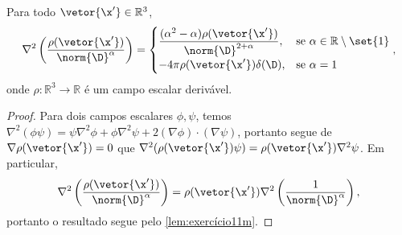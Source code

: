 \begin{corollary}
    Para todo \(\vetor{\x'} \in \mathbb{R}^3\),
    \begin{equation*}
        \nabla^2\left(\frac{\rho(\vetor{\x'})}{\norm{\D}^\alpha}\right) = \begin{cases}
            \dfrac{(\alpha^2 - \alpha)\rho(\vetor{\x'})}{\norm{\D}^{2 + \alpha}}, &\text{se } \alpha \in \mathbb{R} \setminus \set{1}\\
            -4\pi  \rho(\vetor{\x'})\delta(\D), &\text{se }\alpha = 1\\
    \end{cases},
    \end{equation*}
    onde \(\rho : \mathbb{R}^3 \to \mathbb{R}\) é um campo escalar derivável.
\end{corollary}
\begin{proof}
    Para dois campos escalares \(\phi, \psi\), temos \(\nabla^2(\phi\psi) = \psi \nabla^2\phi + \phi \nabla^2\psi + 2(\nabla\phi)\cdot(\nabla \psi)\), portanto segue de \(\nabla\rho(\vetor{\x'}) = 0\) que \(\nabla^2(\rho(\vetor{\x'})\psi) = \rho(\vetor{\x'}) \nabla^2\psi\). Em particular,
    \begin{equation*}
        \nabla^2\left(\frac{\rho(\vetor{\x'})}{\norm{\D}^\alpha}\right) = \rho(\vetor{\x'}) \nabla^2\left(\frac{1}{\norm{\D}^\alpha}\right),
    \end{equation*}
    portanto o resultado segue pelo \cref{lem:exercício11m}.
\end{proof}
